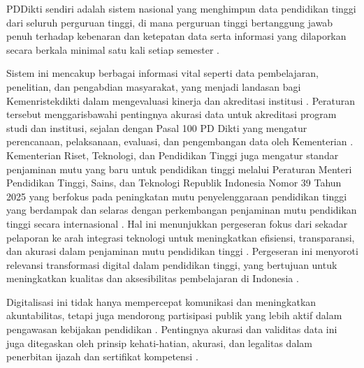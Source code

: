 \documentclass[12pt,a4paper,oneside]{report}
\begin{document}
            PDDikti sendiri adalah sistem nasional yang menghimpun data pendidikan tinggi dari seluruh perguruan tinggi, di mana perguruan tinggi bertanggung jawab penuh terhadap kebenaran dan ketepatan data serta informasi yang dilaporkan secara berkala minimal satu kali setiap semester  \parencite{menteri_pendidikan_fd83efd6}.
        \par
            Sistem ini mencakup berbagai informasi vital seperti data pembelajaran, penelitian, dan pengabdian masyarakat, yang menjadi landasan bagi Kemenristekdikti dalam mengevaluasi kinerja dan akreditasi institusi  \parencite{sigit_auliana_13f309fe}  \parencite{peraturan_menteri_pendidikan_tinggi__sains__dan_teknologi_tentang_penjaminan_mutu_pendidikan_tinggi_4712741f}.
            Peraturan tersebut menggarisbawahi pentingnya akurasi data untuk akreditasi program studi dan institusi, sejalan dengan Pasal 100 PD Dikti yang mengatur perencanaan, pelaksanaan, evaluasi, dan pengembangan data oleh Kementerian  \parencite{menteri_pendidikan_fd83efd6}.
            Kementerian Riset, Teknologi, dan Pendidikan Tinggi juga mengatur standar penjaminan mutu yang baru untuk pendidikan tinggi melalui Peraturan Menteri Pendidikan Tinggi, Sains, dan Teknologi Republik Indonesia Nomor 39 Tahun 2025 yang berfokus pada peningkatan mutu penyelenggaraan pendidikan tinggi yang berdampak
            dan selaras dengan perkembangan penjaminan mutu pendidikan tinggi secara internasional  \parencite{peraturan_menteri_pendidikan_tinggi__sains__dan_teknologi_tentang_penjaminan_mutu_pendidikan_tinggi_4712741f}. Hal ini menunjukkan pergeseran fokus dari sekadar pelaporan ke arah integrasi teknologi untuk meningkatkan efisiensi, transparansi, dan akurasi dalam penjaminan mutu pendidikan tinggi  \parencite{khusnul_khotimah_8e1a714c}.
            Pergeseran ini menyoroti relevansi transformasi digital dalam pendidikan tinggi, yang bertujuan untuk meningkatkan kualitas dan aksesibilitas pembelajaran di Indonesia  \parencite{mochamad_nashrullah_00046d12}.
        \par
            Digitalisasi ini tidak hanya mempercepat komunikasi dan meningkatkan akuntabilitas, tetapi juga mendorong partisipasi publik yang lebih aktif dalam pengawasan kebijakan pendidikan  \parencite{nadiatus_soleha_f1ff679f}.
            Pentingnya akurasi dan validitas data ini juga ditegaskan oleh prinsip kehati-hatian, akurasi, dan legalitas dalam penerbitan ijazah dan sertifikat kompetensi  \parencite{peraturan_menteri_pendidikan__kebudayaan__riset__dan_teknologi_tentang_ijazah__sertifikat_kompetensi__dan_sertifikat_profesi_jenjang_pendidikan_tinggi_ee3b738b}.
\end{document}
